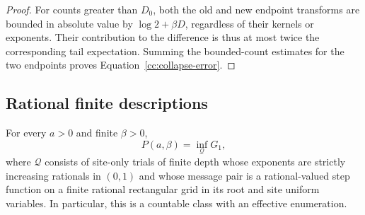 \begin{proof}
For counts greater than $D_0$, both the old and new endpoint transforms
are bounded in absolute value by $\log2+\beta D$, regardless of their
kernels or exponents.  Their contribution to the difference is thus
at most twice the corresponding tail expectation.  Summing the
bounded-count estimates for the two endpoints proves
Equation~\eqref{cc:collapse-error}.
\end{proof}

\subsection{Rational finite descriptions}

\begin{theorem}\label{cc:complete}
\label{cc:rational}
For every $a>0$ and finite $\beta>0$,
\begin{equation}\label{cc:finite-infimum}
 P(a,\beta)=\inf_{\mathcal Q}G_1,
\end{equation}
where $\mathcal Q$ consists of site-only trials of finite depth whose
exponents are strictly increasing rationals in $(0,1)$ and whose
message pair is a rational-valued step function on a finite rational
rectangular grid in its root and site uniform variables.  In
particular, this is a countable class with an effective enumeration.
\end{theorem}

